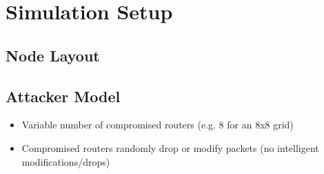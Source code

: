 \documentclass[
	paper=a4,
	fontsize=11pt,
	parskip=full %
]{scrreprt}
\begin{document}
    \chapter{Simulation Setup}
    \section{Node Layout}

    \section{Attacker Model}
    \begin{itemize}
        \item Variable number of compromised routers (e.g. 8 for an 8x8 grid)
        \item Compromised routers randomly drop or modify packets (no intelligent modifications/drops)
    \end{itemize}
\end{document}
